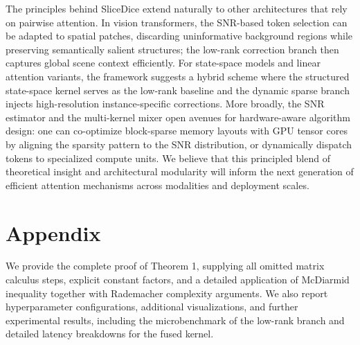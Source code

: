 \documentclass{article}
\begin{document}
The principles behind SliceDice extend naturally to other architectures that rely on pairwise attention. In vision transformers, the SNR-based token selection can be adapted to spatial patches, discarding uninformative background regions while preserving semantically salient structures; the low-rank correction branch then captures global scene context efficiently. For state-space models and linear attention variants, the framework suggests a hybrid scheme where the structured state-space kernel serves as the low-rank baseline and the dynamic sparse branch injects high-resolution instance-specific corrections. More broadly, the SNR estimator and the multi-kernel mixer open avenues for hardware-aware algorithm design: one can co-optimize block-sparse memory layouts with GPU tensor cores by aligning the sparsity pattern to the SNR distribution, or dynamically dispatch tokens to specialized compute units. We believe that this principled blend of theoretical insight and architectural modularity will inform the next generation of efficient attention mechanisms across modalities and deployment scales.

\section*{Appendix}
We provide the complete proof of Theorem 1, supplying all omitted matrix calculus steps, explicit constant factors, and a detailed application of McDiarmid inequality together with Rademacher complexity arguments. We also report hyperparameter configurations, additional visualizations, and further experimental results, including the microbenchmark of the low-rank branch and detailed latency breakdowns for the fused kernel.
\end{document}
